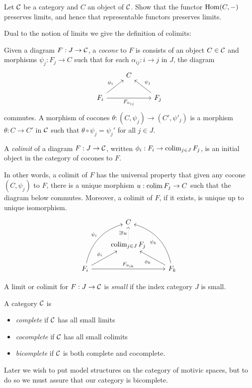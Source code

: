 \begin{exercise}\label{preserving}
Let $\mathcal{C}$ be a category and $C$ an object of $\mathcal{C}$. Show that the functor $\operatorname{Hom}(C,-)$ preserves limits, and hence that representable functors preserves limits.
\end{exercise}

Dual to the notion of limits we give the definition of colimits:

\begin{definition}
Given a diagram $F:J\to\mathcal{C}$, a \emph{cocone} to $F$ is consists of an object $C\in\mathcal{C}$ and morphisms $\psi_j:F_j\to C$ such that for each $\alpha_{ij}:i\to j$ in $J$, the diagram
\[\begin{tikzcd}
& C\\
F_i\arrow{ur}{\psi_i}\arrow{rr}[swap]{F_{\alpha_{ij}}} & & F_j\arrow{ul}[swap]{\psi_j}
\end{tikzcd}\]commutes. A morphism of cocones $\theta:(C,\psi_j)\to(C',\psi'_j)$ is a morphism $\theta:C\to C'$ in $\mathcal{C}$ such that $\theta\circ\psi_j=\psi_j'$ for all $j\in J$.
\end{definition}

\begin{definition}
A \emph{colimit} of a diagram $F:J\to\mathcal{C}$, written $\phi_i:F_i\to\operatorname{colim}_{j\in J}F_j$, is an initial object in the category of cocones to $F$.
\end{definition}
In other words, a colimit of $F$ has the universal property that given any cocone $(C,\psi_j)$ to $F$, there is a unique morphism $u:\operatorname{colim} F_j\to C$ such that the diagram below commutes. Moreover, a colimit of $F$, if it exists, is unique up to unique isomorphism.
\[\begin{tikzcd}
& C &  \\
 & \colim_{j\in J}F_j\arrow[u, dotted, "\exists!u"] & \\
F_i\arrow[rr, "F_{\alpha_{ik}}"]\arrow[uur, bend left, "\psi_i"]\arrow[ur, "\phi_i"] & &F_k\arrow[uul, bend right, "\psi_k"]\arrow[ul, "\phi_k"]
\end{tikzcd}\]

\begin{definition}
A limit or colimit for $F:J\to\mathcal{C}$ is \emph{small} if the index category $J$ is small.

A category $\mathcal{C}$ is 
\begin{itemize}
\item \emph{complete} if $\mathcal{C}$ has all small limits
\item \emph{cocomplete} if $\mathcal{C}$ has all small colimits
\item \emph{bicomplete} if $\mathcal{C}$ is both complete and cocomplete.

\end{itemize}

\end{definition}
Later we wish to put model structures on the category of motivic spaces, but to do so we must assure that our category is bicomplete.

